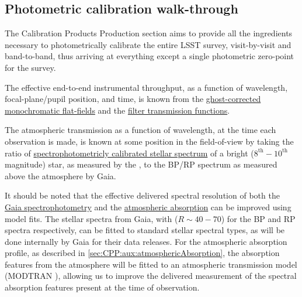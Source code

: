 




\subsection{Photometric calibration walk-through}
\label{sec:CPP:walkthrough}
The Calibration Products Production section aims to provide all the ingredients necessary to photometrically calibrate the entire LSST survey, visit-by-visit and band-to-band, thus arriving at everything except a single photometric zero-point for the survey.

The effective end-to-end instrumental throughput, as a function of wavelength, focal-plane/pupil position, and time, is known from the \hyperref[sec:CPP:output:monoPhotoFlat]{ghost-corrected monochromatic flat-fields} and the \hyperref[sec:CPP:output:filterTransmission]{filter transmission functions}.

The atmospheric transmission as a function of wavelength, at the time each observation is made, is known at some position in the field-of-view by taking the ratio of \hyperref[sec:CPP:output:spectrophotometricStandards]{spectrophotometricly calibrated stellar spectrum} of a bright ($8^{\text{th}}-10^{\text{th}}$ magnitude) star, as measured by the \auxtelescope, to the BP/RP spectrum as measured above the atmosphere by Gaia.


It should be noted that the effective delivered spectral resolution of both the \hyperref[sec:CPP:output:spectrophotometricStandards]{Gaia spectrophotometry} and the \hyperref[sec:CPP:aux:atmosphericAbsorption]{atmospheric absorption} can be improved using model fits. The stellar spectra from Gaia, with ($R \sim 40-70$) for the BP and RP spectra respectively\cite{GaiaSpecs}, can be fitted to standard stellar spectral types, as will be done internally by Gaia for their data releases\citep{2010MNRAS.403...96B}. For the atmospheric absorption profile, as described in \secsymbol\ref{sec:CPP:aux:atmosphericAbsorption}, the absorption features from the atmosphere will be fitted to an atmospheric transmission model (\eg MODTRAN \etc), allowing us to improve the delivered measurement of the spectral absorption features present at the time of observation.


